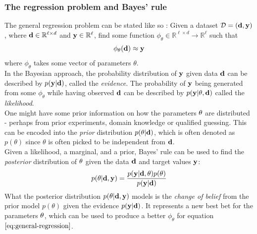 \subsubsection{The regression problem and Bayes' rule}
The general regression problem can be stated like so \cite{krause22}:
Given a dataset $\mathcal{D} = (\mathbf{d}, \mathbf{y})$, where $\mathbf{d}\in \mathbb{R}^{\ell \times d}$ and $\mathbf{y} \in \mathbb{R}^{\ell}$,  find some function $\phi_\theta \in \mathbb{R}^{\ell \times d} \rightarrow \mathbb{R}^{\ell}$ such that
\begin{equation}
  \label{eq:general-regression}
\phi_\theta(\mathbf{d}) \approx \mathbf{y}
\end{equation}
where $\phi_\theta$ takes some vector of parameters $\theta$.\\
In the Bayesian approach, the probability distribution of $\mathbf{y}$ given data $\mathbf{d}$ can be described by $p(\mathbf{y} | \mathbf{d})$, called the \textit{evidence}.
The probability of $\mathbf{y}$ being generated from some $\phi_\theta$ while having observed $\mathbf{d}$ can be described by $p(\mathbf{y}|\theta, \mathbf{d})$
called the \textit{likelihood}.\\
One might have some prior information on how the parameters $\mathbf{\theta}$ are distributed - perhaps from prior experiments, domain knowledge or qualified guessing. This can be encoded into the \textit{prior} distribution $p(\mathbf{\theta}|\mathbf{d})$, which is often denoted as $p(\theta)$ since $\theta$ is often picked to be independent from $\mathbf{d}$.\\
Given a likelihood, a marginal, and a prior, 
Bayes' rule can be used to find the \textit{posterior} distribution of $\mathbf{\theta}$ given the data $\mathbf{d}$ and target values $\mathbf{y}$:
\begin{equation}
  \label{eq:bayes-rule}
  p(\mathbf{\theta} | \mathbf{d}, \mathbf{y}) = \frac{p(\mathbf{y} | \mathbf{d}, \mathbf{\theta})p(\mathbf{\theta})}{p(\mathbf{y| \mathbf{d}})}
\end{equation}
What the posterior distribution $p(\mathbf{\theta} | \mathbf{d}, \mathbf{y})$ models is the \textit{change of belief} from the prior model $p(\theta)$ given the evidence $p(\mathbf{y} | \mathbf{d})$\cite{krause22}.
It represents a new best bet for the parameters $\mathbf{\theta}$, which can be used to produce a better $\phi_\theta$ for equation $\eqref{eq:general-regression}$.
